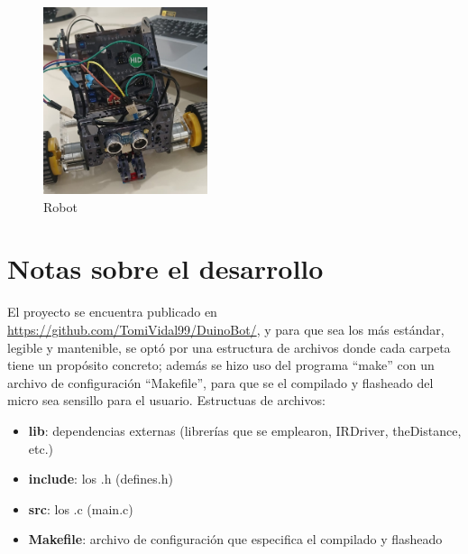 \documentclass[letterpaper, 10 pt, conference]{ieeeconf}  %
\begin{document}
\begin{figure}[H]
  \centering
  \includegraphics[width=0.43\textwidth]{./imagenes/robot.jpeg}
  \caption{Robot}
  \label{fig:robot}
\end{figure}

\section{Notas sobre el desarrollo}
El proyecto se encuentra publicado en \url{https://github.com/TomiVidal99/DuinoBot/}, y para que sea los más estándar, legible y mantenible, se optó por una estructura de archivos donde cada carpeta tiene un propósito concreto; además se hizo uso del programa ``make'' con un archivo de configuración ``Makefile'', para que se el compilado y flasheado del micro sea sensillo para el usuario.
Estructuas de archivos:
\begin{itemize}
  \item \textbf{lib}: dependencias externas (librerías que se emplearon, IRDriver, theDistance, etc.)
  \item \textbf{include}: los .h (defines.h)
  \item \textbf{src}: los .c (main.c)
  \item \textbf{Makefile}: archivo de configuración que especifica el compilado y flasheado
\end{itemize}
\end{document}
